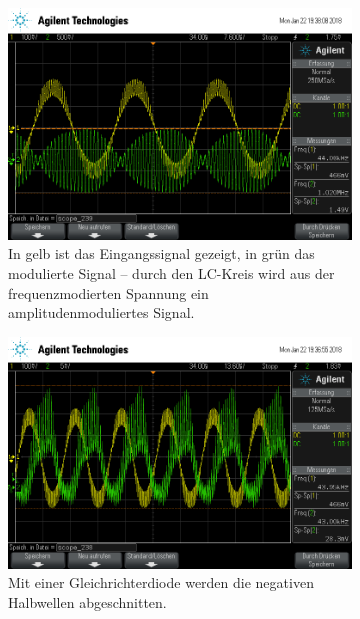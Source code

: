 \begin{figure}[t!]
	\centering
	\begin{subfigure}[t]{0.48\textwidth}
		\centering
		\includegraphics[width=\textwidth]{img/h_scope_239.png}
		\caption{In gelb ist das Eingangssignal gezeigt, in grün das modulierte Signal -- durch den LC-Kreis wird aus der frequenzmodierten Spannung ein amplitudenmoduliertes Signal.}
		\label{amp}
	\end{subfigure}\hfill%
	\begin{subfigure}[t]{0.48\textwidth}
		\centering
		\includegraphics[width=\textwidth]{img/h_scope_238.png}
		\caption{Mit einer Gleichrichterdiode werden die negativen Halbwellen abgeschnitten.}
		\label{De-FM}
	\end{subfigure}
	\\
	\begin{subfigure}[t]{0.5\textwidth}
		\centering

\end{subfigure}
\end{figure}
